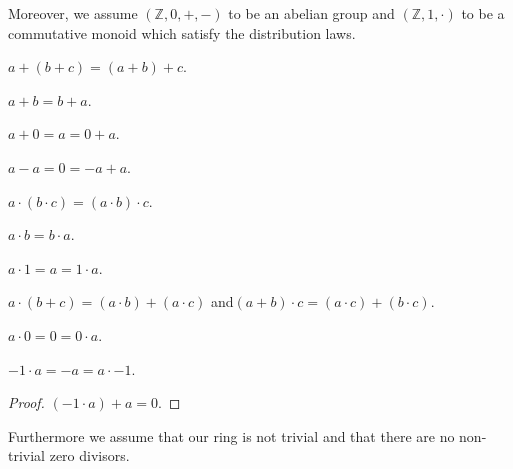 \documentclass{article}
\newcommand{\Int}{\mathbb{Z}}
\begin{document}
  Moreover, we assume $(\Int, 0, +, -)$ to be an abelian group and $(\Int, 1, \cdot)$ to be a commutative monoid which satisfy the distribution laws.

  \begin{forthel}
    \begin{axiom}[AddAsso]
      $a + (b + c) = (a + b) + c$.
    \end{axiom}

    \begin{axiom}[AddComm]
      $a + b = b + a$.
    \end{axiom}

    \begin{axiom}[AddZero]
      $a + 0 = a = 0 + a$.
    \end{axiom}

    \begin{axiom}[AddNeg]
      $a - a = 0 = -a + a$.
    \end{axiom}

    \begin{axiom}[MulAsso]
      $a \cdot (b \cdot c) = (a \cdot b) \cdot c$.
    \end{axiom}

    \begin{axiom}[MulComm]
      $a \cdot b = b \cdot a$.
    \end{axiom}

    \begin{axiom}[MulOne]
      $a \cdot 1 = a = 1 \cdot a$.
    \end{axiom}

    \begin{axiom}[Distrib]
      $a \cdot (b + c) = (a \cdot b) + (a \cdot c)$ and$ (a + b) \cdot c = (a \cdot c) + (b \cdot c)$.
    \end{axiom}

    \begin{lemma}[MulZero]
      $a \cdot 0 = 0 = 0 \cdot a$.
    \end{lemma}

    \begin{lemma}[MulMinOne]
      $-1 \cdot a = -a = a \cdot -1$.
    \end{lemma}
    \begin{proof}
      $(-1 \cdot a) + a = 0$.
    \end{proof}
  \end{forthel}

  Furthermore we assume that our ring is not trivial and that there are no non-trivial zero divisors.
\end{document}
